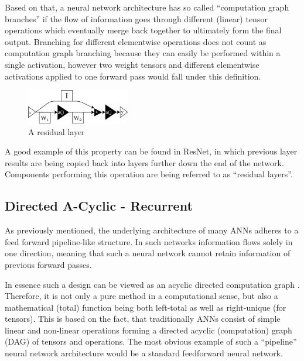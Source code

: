 Based on that, a neural network architecture has so called “computation graph branches” if the flow of information goes through different (linear) tensor operations which eventually merge back together to ultimately form the final output.
Branching for different elementwise operations does not count as computation graph branching because they can easily be performed within a single activation, however two weight tensors and different elementwise activations applied to one forward pass would fall under this definition.\linebreak

\begin{figure}
  \centering 
  \includegraphics[width=0.40\textwidth]{PICs/residual-layer.png} 
  \caption{A residual layer}
\end{figure}

A good example of this property can be found in ResNet, in which previous layer results are being copied back into layers further down the end of the network. 
Components performing this operation are being referred to as “residual layers”.
\cite{9_deep-res-Learning_2015}
 
 
\clearpage




\subsection{Directed A-Cyclic - Recurrent}\label{subsec_directed-a-cyclic}

As previously mentioned, the underlying architecture of many ANNs adheres to a feed forward pipeline-like structure. In such networks information flows solely in one direction, meaning that such a neural network cannot retain information of previous forward passes. 

In essence such a design can be viewed as an acyclic directed computation graph \cite[chapter 6]{Goodfellow-et-al-2016}. Therefore, it is not only a pure method in a computational sense, but also a mathematical (total) function being both left-total as well as right-unique (for tensors). 
This is based on the fact, that traditionally ANNs consist of simple linear and non-linear operations forming a directed acyclic (computation) graph (DAG) of tensors and operations. 
\cite[p. 8-10]{10_rec-NN-Review_2015} The most obvious example of such a “pipeline” neural network architecture would be a standard feedforward neural network.\linebreak

